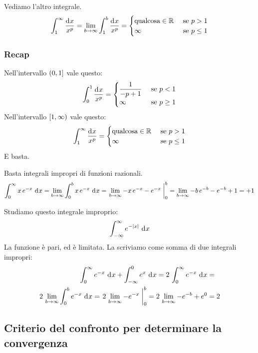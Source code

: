 Vediamo l'altro integrale.
\[
\int_{1}^{\infty} \frac{\diff x}{x^p} =
\lim_{b \to \infty} \int_{1}^{b} \frac{\diff x}{x^p} = 
\begin{cases}
\text{qualcosa} \in \reals & \text{ se } p > 1 \\
\infty & \text{ se } p \le 1
\end{cases}
\]

\subsubsection{Recap}

Nell'intervallo $\left( {0}, {1} \right]$ vale questo:
\[
\int_{0}^{1} \frac{\diff x}{x^p} = 
\begin{cases}
\dfrac{1}{- p + 1} & \text{ se } p < 1 \\
\infty & \text{ se } p \ge 1
\end{cases}
\]
Nell'intervallo $\left[ {1}, {\infty} \right)$ vale questo:
\[
\int_{1}^{\infty} \frac{\diff x}{x^p} =
\begin{cases}
\text{qualcosa} \in \reals & \text{ se } p > 1 \\
\infty & \text{ se } p \le 1
\end{cases}
\]
E basta.

\begin{exmp}
Basta integrali impropri di funzioni razionali.
\[
\int_{0}^{\infty} x \, e^{-x} \dx =
\lim_{b \to \infty} \int_{0}^{b} x \, e^{-x} \dx = 
\increment{\lim_{b \to \infty} -x \, e^{-x} - e^{-x}}_{0}^{b} =
\lim_{b \to \infty} -b \, e^{-b} - e^{-b} + 1 = + 1
\]
\end{exmp}

\begin{exmp}
Studiamo questo integrale improprio:
\[
\int_{- \infty}^{\infty} e^{-\abs{x}} \dx
\]
La funzione \`e pari, ed \`e limitata. La scriviamo come somma di due integrali impropri:
\begin{align*}
\int_{0}^{\infty} e^{-x} \dx + \int_{-\infty}^{0} e^{x} \dx =
2 \, \int_{0}^{\infty} e^{-x} \dx &= \\
2 \, \lim_{b \to \infty} \int_{0}^{b} e^{-x} \dx = 
\increment{2 \, \lim_{b \to \infty} - e^{-x}}_{0}^{b} = 
2 \, \lim_{b \to \infty} - e^{-b} + e^{0} &= 2
\end{align*}
\end{exmp}

\subsection{Criterio del confronto per determinare la convergenza}

